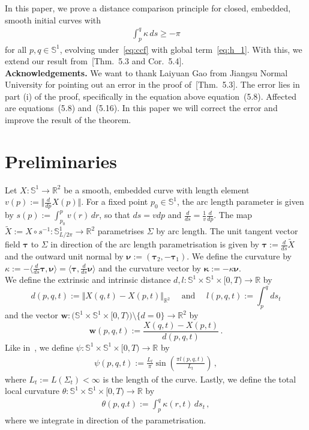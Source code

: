 \documentclass[reqno]{amsart}
\theoremstyle{definition}
\def\bkappa{\boldsymbol\kappa}
\def\btau{\boldsymbol{\tau}}
\def\bw{\mathbf{w}}
\def\nnu{\boldsymbol{\nu}}
\def\R{\mathbb{R}}
\def\Si{\Sigma}
\def\Sp{\Sph^1}
\def\Sph{\mathbb{S}}
\def\St{\Si_t}
\newcommand{\fracd}[2]{{\frac{d #1}{d #2}}}
\begin{document}
In this paper, we prove a distance comparison principle for closed, embedded, smooth initial curves with
\begin{align*}
\int_p^q\kappa\,ds\geq-\pi
\end{align*}
for all $p,q\in\Sp$, evolving under~\eqref{eq:ccf} with global term~\eqref{eq:h_1}.
With this, we extend our result from~\cite{Dittberner21}[Thm.~5.3 and Cor.~5.4]. \\

\textbf{Acknowledgements.}
We want to thank Laiyuan Gao from Jiangsu Normal University for pointing out an error in the proof of~\cite{Dittberner21}[Thm.~5.3].
The error lies in part (i) of the proof, specifically in the equation above equation~(5.8). 
Affected are equations~(5.8) and~(5.16).
In this paper we will correct the error and improve the result of the theorem.

\section{Preliminaries}

Let $X:\Sp\to\R^2$ be a smooth, embedded curve with length element $v(p):=\big\Vert\fracd{}{p}X(p)\big\Vert$.
For a fixed point $p_0\in\Sp$, the arc length parameter is given by $s(p):=\int_{p_0}^pv(r)\,dr$, so that $ds=vdp$ and $\fracd{}{s}=\frac1{v}\fracd{}{p}$.
The map $\tilde X:=X\circ s^{-1}:\Sp_{L/2\pi}\to\R^2$ parametrises $\Si$ by arc length.
The unit tangent vector field $\btau$ to $\Si$ in direction of the arc length parametrisation is given by $\btau:=\fracd{}{s}\tilde X$ and the outward unit normal by $\nnu:=(\btau_2,-\btau_1)$.
We define the curvature by $\kappa:=-\langle\fracd{}{s}\btau,\nnu\rangle=\langle\btau,\fracd{}{s}\nnu\rangle$ and the curvature vector by $\bkappa:=-\kappa\nnu$.\\

We define the extrinsic and intrinsic distance $d,l:\Sp\times\Sp\times[0,T)\to\R$ by
$$d(p,q,t):=\Vert X(q,t)-X(p,t)\Vert_{\R^2}\quad\text{ and }\quad l(p,q,t):=\int_p^qds_t$$
and the vector $\bw:\big(\Sp\times\Sp\times[0,T)\big)\setminus\{d=0\}\to\R^2$ by
$$\bw(p,q,t):=\frac{X(q,t)-X(p,t)}{d(p,q,t)}\,.$$
Like in~\cite{Huisken95}, we define $\psi:\Sp\!\times\Sp\!\times[0,T)\to\R$ by
\begin{align}\label{eq:defpsi}
\psi(p,q,t):=\frac{L_t}\pi\sin\!\left(\frac{\pi l(p,q,t)}{L_t}\right)\,,
\end{align}
where $L_t:=L(\St)<\infty$ is the length of the curve.
Lastly, we define the total local curvature $\theta:\Sp\times\Sp\times[0,T)\to\R$ by
\begin{align}\label{eq:deftheta}
\theta(p,q.t):=\int_p^q\kappa(r,t)\,ds_t\,,
\end{align}
where we integrate in direction of the parametrisation.
\end{document}
